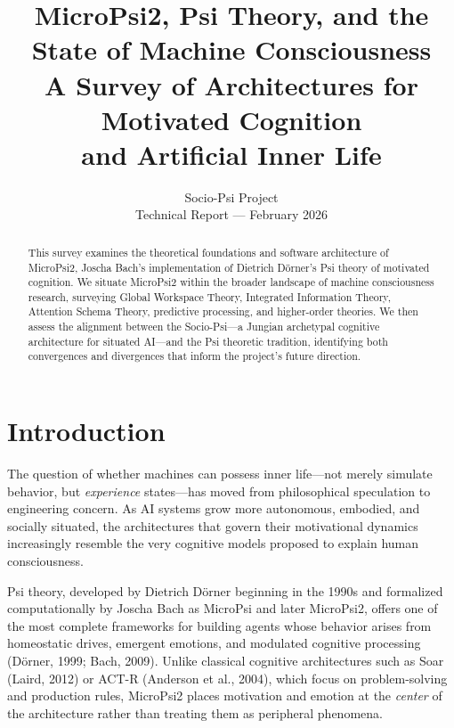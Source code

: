 \documentclass[11pt,letterpaper]{article}
\title{%
  \sffamily\bfseries
  \textcolor{jungblue}{MicroPsi2, Psi Theory, and the\\[0.3em]
  State of Machine Consciousness}\\[0.8em]
  \large\textcolor{jungmuted}{A Survey of Architectures for Motivated Cognition\\
  and Artificial Inner Life}
}
\author{%
  \sffamily Socio-Psi Project\\[0.3em]
  \small\textcolor{jungmuted}{Technical Report --- February 2026}
}
\date{}
\begin{document}
\maketitle
\thispagestyle{fancy}

\begin{abstract}
\noindent
This survey examines the theoretical foundations and software architecture of
MicroPsi2, Joscha Bach's implementation of Dietrich D\"orner's Psi theory of
motivated cognition. We situate MicroPsi2 within the broader landscape of
machine consciousness research, surveying Global Workspace Theory, Integrated
Information Theory, Attention Schema Theory, predictive processing, and
higher-order theories. We then assess the alignment between the Socio-Psi---a
Jungian archetypal cognitive architecture for situated AI---and the Psi
theoretic tradition, identifying both convergences and divergences that inform
the project's future direction.
\end{abstract}

\vspace{1em}
\tableofcontents
\newpage

\section{Introduction}

The question of whether machines can possess inner life---not merely simulate
behavior, but \emph{experience} states---has moved from philosophical
speculation to engineering concern. As AI systems grow more autonomous,
embodied, and socially situated, the architectures that govern their
motivational dynamics increasingly resemble the very cognitive models proposed
to explain human consciousness.

Psi theory, developed by Dietrich D\"orner beginning in the 1990s and
formalized computationally by Joscha Bach as MicroPsi and later MicroPsi2,
offers one of the most complete frameworks for building agents whose behavior
arises from homeostatic drives, emergent emotions, and modulated cognitive
processing (D\"orner, 1999; Bach, 2009). Unlike classical cognitive
architectures such as Soar (Laird, 2012) or ACT-R (Anderson et al., 2004),
which focus on problem-solving and production rules, MicroPsi2 places
motivation and emotion at the \emph{center} of the architecture rather than
treating them as peripheral phenomena.
\end{document}
